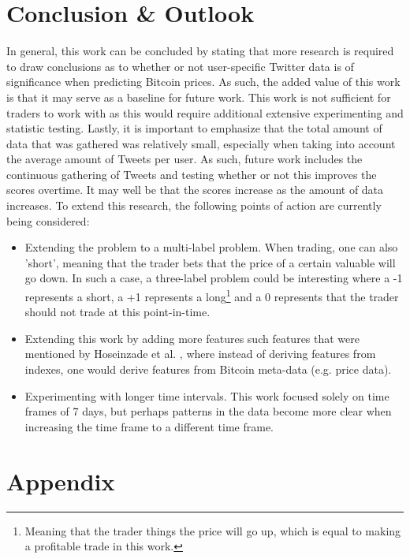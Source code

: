 \documentclass[sigconf]{acmart-txmm}
\begin{document}
\section{Conclusion \& Outlook}
In general, this work can be concluded by stating that more research is required to draw conclusions as to whether or not user-specific Twitter data is of significance when predicting Bitcoin prices.
As such, the added value of this work is that it may serve as a baseline for future work. This work is not sufficient for traders to work with as this would require additional extensive experimenting and statistic testing.
Lastly, it is important to emphasize that the total amount of data that was gathered was relatively small, especially when taking into account the average amount of Tweets per user. As such, future work includes the continuous gathering of Tweets and testing whether or not this improves the scores overtime. It may well be that the scores increase as the amount of data increases.
To extend this research, the following points of action are currently being considered:
\begin{itemize}
    \item Extending the problem to a multi-label problem. When trading, one can also 'short', meaning that the trader bets that the price of a certain valuable will go down. In such a case, a three-label problem could be interesting where a -1 represents a short, a +1 represents a long\footnote{Meaning that the trader things the price will go up, which is equal to making a profitable trade in this work.} and a 0 represents that the trader should not trade at this point-in-time.
    \item Extending this work by adding more features such features that were mentioned by Hoseinzade et al. \cite{1810.08923}, where instead of deriving features from indexes, one would derive features from Bitcoin meta-data (e.g. price data).
    \item Experimenting with longer time intervals. This work focused solely on time frames of 7 days, but perhaps patterns in the data become more clear when increasing the time frame to a different time frame.
\end{itemize}


\def\bibfont{\small} %


\appendix
\section*{Appendix}
\end{document}

